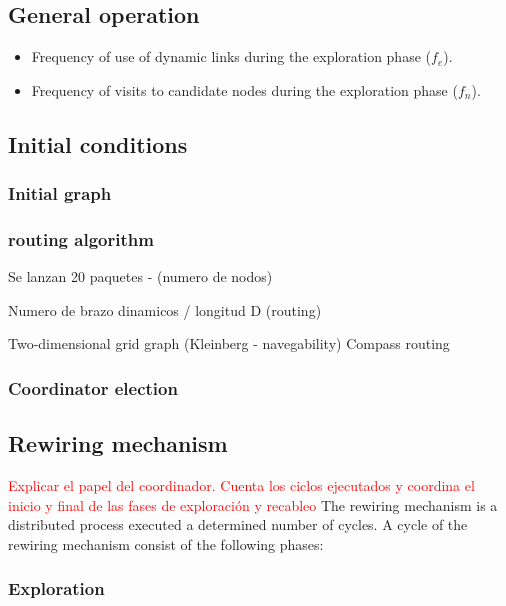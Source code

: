 \subsection{General operation}

\begin{itemize}
    \item Frequency of use of dynamic links during the exploration phase ($f_e$).
    \item Frequency of visits to candidate nodes during the exploration phase ($f_n$).
\end{itemize}

\subsection{Initial conditions}

\subsubsection{Initial graph} 

\subsubsection{routing algorithm}

Se lanzan 20 paquetes - (numero de nodos)

Numero de brazo dinamicos / longitud D (routing)

Two-dimensional grid graph (Kleinberg - navegability)
Compass routing

\subsubsection{Coordinator election}



\subsection{Rewiring mechanism}
\textcolor{red}{Explicar el papel del coordinador. Cuenta los ciclos ejecutados y coordina el inicio y final de las fases de exploración y recableo}
The rewiring mechanism is a distributed process executed a determined number of cycles. A cycle of the rewiring mechanism consist of the following phases:

\subsubsection{Exploration}

